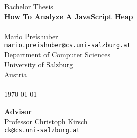 \documentclass[10pt,fleqn, titlepage]{article}
\newcommand{\JS}{JavaScript\xspace}
\begin{document}
	
	
	\begin{titlepage}
		\centering

		\vspace*{\fill}
		{\LARGE 
		Bachelor Thesis									\\ \bigskip
		\textbf{How To Analyze A \JS Heap}}				\\ \bigskip
		~ \\ \bigskip
		\Large Mario Preishuber 						\\ \smallskip
		\large
		\texttt{mario.preishuber@cs.uni-salzburg.at}	\\ \bigskip
		Department of Computer Sciences					\\ \smallskip			
		University of Salzburg							\\ \smallskip
		Austria											\\ \bigskip 
		~ \\ \bigskip
		\today
		\vspace*{\fill}
		
		\textbf{Advisor} 								\\ \bigskip
		Professor Christoph Kirsch						\\ \smallskip
		\texttt{ck@cs.uni-salzburg.at}					\\ \bigskip
	\end{titlepage}
	
	
	
	
	
	
	
	
	
	
	
	
	
	
	\appendix
	
	
	
	
\end{document}
